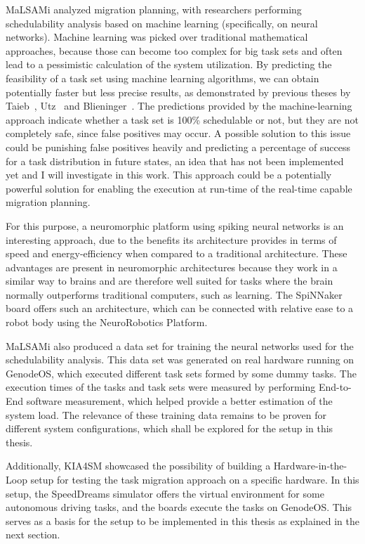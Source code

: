 MaLSAMi analyzed migration planning, with researchers performing schedulability analysis based on machine learning (specifically, on neural networks). Machine learning was picked over traditional mathematical approaches, because those can become too complex for big task sets and often lead to a pessimistic calculation of the system utilization. By predicting the feasibility of a task set using machine learning algorithms, we can obtain potentially faster but less precise results, as demonstrated by previous theses by Taieb~\parencite{taieb1}, Utz~\parencite{utz1} and Blieninger~\parencite{blieninger1}. The predictions provided by the machine-learning approach indicate whether a task set is 100\% schedulable or not, but they are not completely safe, since false positives may occur. A possible solution to this issue could be punishing false positives heavily and predicting a percentage of success for a task distribution in future states, an idea that has not been implemented yet and I will investigate in this work. This approach could be a potentially powerful solution for enabling the execution at run-time of the real-time capable migration planning.

For this purpose, a neuromorphic platform using spiking neural networks is an interesting approach, due to the benefits its architecture provides in terms of speed and energy-efficiency when compared to a traditional architecture. These advantages are present in neuromorphic architectures because they work in a similar way to brains and are therefore well suited for tasks where the brain normally outperforms traditional computers, such as learning. The SpiNNaker board offers such an architecture, which can be connected with relative ease to a robot body using the NeuroRobotics Platform.

MaLSAMi also produced a data set for training the neural networks used for the schedulability analysis. This data set was generated on real hardware running on GenodeOS, which executed different task sets formed by some dummy tasks. The execution times of the tasks and task sets were measured by performing End-to-End software measurement, which helped provide a better estimation of the system load. The relevance of these training data remains to be proven for different system configurations, which shall be explored for the setup in this thesis.

Additionally, KIA4SM showcased the possibility of building a Hardware-in-the-Loop setup for testing the task migration approach on a specific hardware. In this setup, the SpeedDreams simulator offers the virtual environment for some autonomous driving tasks, and the boards execute the tasks on GenodeOS. This serves as a basis for the setup to be implemented in this thesis as explained in the next section.

